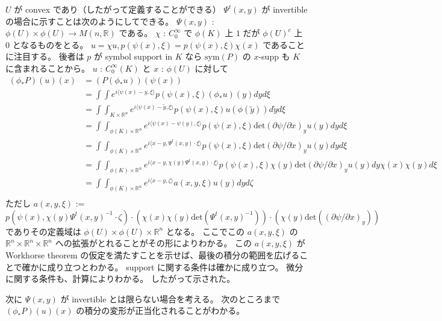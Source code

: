 \documentclass[dvipdfmx]{jsarticle}
\begin{document}
\(U\) が convex であり（したがって定義することができる） \(\Psi^t(x,y)\) が invertible の場合に示すことは次のようにしてできる。
\(\Psi(x,y)\) : \(\phi(U) \times \phi(U) \to M(n , \mathbb{R})\) である。
\(\chi\) : \(C^\infty_0\) で \(\phi(K)\) 上 \(1\) だが \(\phi(U)^c\) 上 \(0\) となるものをとる。
\(u = \chi u , p(\psi(x),\xi) = p(\psi(x),\xi) \chi(x)\) であることに注目する。
後者は \(p\) が symbol support in \(K\) なら \(\text{sym}(P)\) の \(x\)-supp も \(K\) に含まれることから。
\(u\) : \(C^\infty_0(K)\) と \(x\) : \(\phi(U)\) に対して
\begin{align*}
  (\phi_* P)(u)(x) &= (P(\phi_* u)) (\psi(x)) \\
  &= \int \int e^{i \langle \psi(x) - y , \xi \rangle} p(\psi(x) , \xi) (\phi_* u)(y) dy d\xi \\
  &= \int \int_{K \times \mathbb{R}^n} e^{i \langle \psi(x) - \tilde{y} , \xi \rangle} p(\psi(x) , \xi) u(\phi(\tilde{y})) d\tilde{y} d\xi \\
  &= \int \int_{\phi(K) \times \mathbb{R}^n} e^{i \langle \psi(x) - \psi(y) , \xi \rangle} p(\psi(x) , \xi) \text{det} (\partial \psi / \partial x)_y u(y) dy d\xi \\
  &= \int \int_{\phi(K) \times \mathbb{R}^n} e^{i \langle x - y , \Psi^t(x,y) \cdot \xi \rangle} p(\psi(x) , \xi) \text{det} (\partial \psi / \partial x)_y u(y) dy d\xi \\
  &= \int \int_{\phi(K) \times \mathbb{R}^n} e^{i \langle x - y , \chi(y) \Psi^t(x,y) \cdot \xi \rangle} p(\psi(x) , \xi) \chi(y) \text{det} (\partial \psi / \partial x)_y u(y) dy \chi(x) \chi(y) d\xi \\
  &= \int \int_{\phi(K) \times \mathbb{R}^n} e^{i \langle x - y , \zeta \rangle} a(x,y,\xi) u(y) dy d\zeta \\
\end{align*}
ただし \(a(x,y,\xi)\) := \(p(\psi(x) , \chi(y) \Psi^t(x,y)^{-1} \cdot \zeta) \cdot (\chi(x) \chi(y) \text{det} (\Psi^t(x,y)^{-1})) \cdot (\chi(y) \text{det} ((\partial \psi / \partial x)_y))\) でありその定義域は \(\phi(U) \times \phi(U) \times \mathbb{R}^n\) となる。
ここでこの \(a(x,y,\xi)\) の \(\mathbb{R}^n \times \mathbb{R}^n \times \mathbb{R}^n\) への拡張がとれることがその形によりわかる。
この \(a(x,y,\xi)\) が Workhorse theorem の仮定を満たすことを示せば、最後の積分の範囲を広げることで確かに成り立つとわかる。
support に関する条件は確かに成り立つ。
微分に関する条件も、計算によりわかる。
したがって示された。

次に \(\Psi(x,y)\) が invertible とは限らない場合を考える。
次のところまで \((\phi_* P)(u)(x)\) の積分の変形が正当化されることがわかる。
\end{document}
